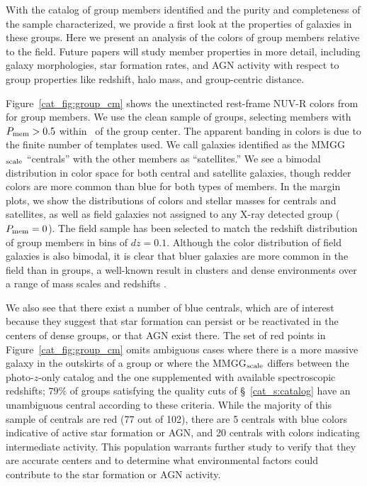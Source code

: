 With the catalog of group members identified and the purity and
completeness of the sample characterized, we provide a first look at
the properties of galaxies in these groups. Here we present
an analysis of the colors of group members
relative to the field. Future papers will study member properties in
more detail, including galaxy morphologies, star formation rates, and
AGN activity with respect to group properties like redshift, halo
mass, and group-centric distance.

Figure~\ref{cat_fig:group_cm} shows the unextincted rest-frame NUV-R
colors from \citet{Ilbert2010} for group members. We use the clean
sample of groups, selecting members with $P_{\rm mem}>0.5$ within
\rvir\ of the group center. The apparent banding in colors is due to
the finite number of templates used. We call
galaxies identified as the MMGG$_{\rm scale}$ ``centrals'' with the
other members as ``satellites.'' We see a
bimodal distribution in color space for both central and satellite
galaxies, though redder colors are more common than blue for both
types of members. In the margin plots, we show the distributions of
colors and stellar masses for centrals and satellites, as well as
field galaxies not assigned to any X-ray detected group ($P_{\rm
  mem}=0$). The field sample has been selected to match the redshift
distribution of group members in bins of $dz=0.1$. Although the color
distribution of field galaxies is also bimodal, it is clear that bluer
galaxies are more common in the field than in groups, a well-known
result in clusters and dense environments over a range of mass scales
and redshifts \citep[e.g.,][]{Gerke2007}.

We also see that there exist a number of blue centrals, which are of
interest because they suggest that star formation can persist or be
reactivated in the centers of dense groups, or that AGN exist there. The set of red
points in Figure~\ref{cat_fig:group_cm} omits ambiguous cases where there
is a more massive galaxy in the outskirts of a group or where the
MMGG$_{\rm scale}$ differs between the photo-$z$-only catalog and
the one supplemented with available spectroscopic redshifts; $79\%$ of
groups satisfying the quality cuts of \S~\ref{cat_s:catalog} have an
unambiguous central according to these criteria. While the majority of
this sample of centrals are red (77 out of 102), there are 5 centrals
with blue colors indicative of active star formation or AGN, and 20 centrals
with colors indicating intermediate activity. This population warrants
further study to verify that they are accurate centers and to
determine what environmental factors could contribute to the star
formation or AGN activity.

